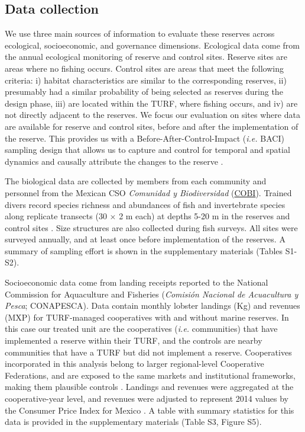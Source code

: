 \documentclass{frontiersSCNS}
\begin{document}
\hypertarget{data-collection}{%
\subsection{Data collection}\label{data-collection}}

We use three main sources of information to evaluate these reserves
across ecological, socioeconomic, and governance dimensions. Ecological
data come from the annual ecological monitoring of reserve and control
sites. Reserve sites are areas where no fishing occurs. Control sites
are areas that meet the following criteria: i) habitat characteristics
are similar to the corresponding reserves, ii) presumably had a similar
probability of being selected as reserves during the design phase, iii)
are located within the TURF, where fishing occurs, and iv) are not
directly adjacent to the reserves. We focus our evaluation on sites
where data are available for reserve and control sites, before and after
the implementation of the reserve. This provides us with a
Before-After-Control-Impact (\emph{i.e.} BACI) sampling design that
allows us to capture and control for temporal and spatial dynamics
\citep{stewartoaten_1986,depalma_2018} and causally attribute the
changes to the reserve
\citep{francinifilho_2008,Villasenor-Derbez_2018}.

The biological data are collected by members from each community and
personnel from the Mexican CSO \emph{Comunidad y Biodiversidad}
(\href{www.cobi.org.mx}{COBI}). Trained divers record species richness
and abundances of fish and invertebrate species along replicate
transects (30 \(\times\) 2 m each) at depths 5-20 m in the reserves and
control sites \citep{suman_2010-ez,fulton_2018,fulton_2019}. Size
structures are also collected during fish surveys. All sites were
surveyed annually, and at least once before implementation of the
reserves. A summary of sampling effort is shown in the supplementary
materials (Tables S1-S2).

Socioeconomic data come from landing receipts reported to the National
Commission for Aquaculture and Fisheries (\emph{Comisión Nacional de
Acuacultura y Pesca}; CONAPESCA). Data contain monthly lobster landings
(Kg) and revenues (MXP) for TURF-managed cooperatives with and without
marine reserves. In this case our treated unit are the cooperatives
(\emph{i.e.} communities) that have implemented a reserve within their
TURF, and the controls are nearby communities that have a TURF but did
not implement a reserve. Cooperatives incorporated in this analysis
belong to larger regional-level Cooperative Federations, and are exposed
to the same markets and institutional frameworks, making them plausible
controls \citep{mccay_2017,ayer_2018}. Landings and revenues were
aggregated at the cooperative-year level, and revenues were adjusted to
represent 2014 values by the Consumer Price Index for Mexico
\citep{oecd_2017}. A table with summary statistics for this data is
provided in the supplementary materials (Table S3, Figure S5).
\end{document}
